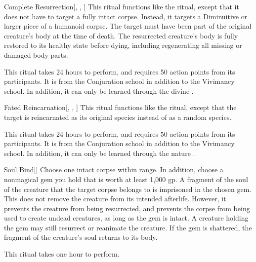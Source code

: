 \lowercase{\hypertarget{spell:Complete Resurrection}{}}\label{spell:Complete Resurrection}
\begin{apability}[\nth{5}]{\hypertarget{spell:Complete Resurrection}{Complete Resurrection}}[, , ]
This ritual functions like the  ritual, except that it does not have to target a fully intact corpse.
Instead, it targets a Diminuitive or larger piece of a humanoid corpse.
The target must have been part of the original creature's body at the time of death.
The resurrected creature's body is fully restored to its healthy state before dying, including regenerating all missing or damaged body parts.

This ritual takes 24 hours to perform, and requires 50 action points from its participants.
It is from the Conjuration school in addition to the Vivimancy school.
In addition, it can only be learned through the divine .
\end{apability}
\vspace{0.25em}



\lowercase{\hypertarget{spell:Fated Reincarnation}{}}\label{spell:Fated Reincarnation}
\begin{apability}[\nth{5}]{\hypertarget{spell:Fated Reincarnation}{Fated Reincarnation}}[, , ]
This ritual functions like the  ritual, except that the target is reincarnated as its original species instead of as a random species.

This ritual takes 24 hours to perform, and requires 50 action points from its participants.
It is from the Conjuration school in addition to the Vivimancy school.
In addition, it can only be learned through the nature .
\end{apability}
\vspace{0.25em}



\lowercase{\hypertarget{spell:Soul Bind}{}}\label{spell:Soul Bind}
\begin{apability}[\nth{5}]{\hypertarget{spell:Soul Bind}{Soul Bind}}[]
Choose one intact corpse within \rngclose range.
In addition, choose a nonmagical gem you hold that is worth at least 1,000 gp.
A fragment of the soul of the creature that the target corpse belongs to is imprisoned in the chosen gem.
This does not remove the creature from its intended afterlife.
However, it prevents the creature from being resurrected, and prevents the corpse from being used to create undead creatures, as long as the gem is intact.
A creature holding the gem may still resurrect or reanimate the creature.
If the gem is shattered, the fragment of the creature's soul returns to its body.

This ritual takes one hour to perform.
\end{apability}
\vspace{0.25em}



